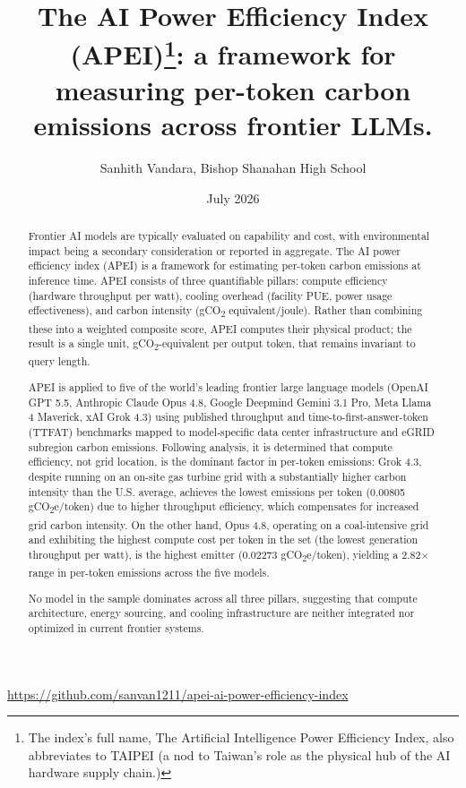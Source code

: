\documentclass[11pt]{article}
\title{The AI Power Efficiency Index (APEI)\thanks{The index's full name, The Artificial Intelligence Power Efficiency Index, also abbreviates to TAIPEI (a nod to Taiwan's role as the physical hub of the AI hardware supply chain.)}: a framework for measuring per-token carbon emissions across frontier LLMs.}
\author{Sanhith Vandara, Bishop Shanahan High School}
\date{July 2026}
\newcommand{\cotwo}{CO\textsubscript{2}}     %
\begin{document}
\maketitle
\vspace{-1.25em}

\begin{center}
\url{https://github.com/sanvan1211/apei-ai-power-efficiency-index}
\end{center}

\begin{abstract}
Frontier AI models are typically evaluated on capability and cost, with environmental impact being a secondary consideration or reported in aggregate. The AI power efficiency index (APEI) is a framework for estimating per-token carbon emissions at inference time. APEI consists of three quantifiable pillars: compute efficiency (hardware throughput per watt), cooling overhead (facility PUE, power usage effectiveness), and carbon intensity (g\cotwo{} equivalent/joule). Rather than combining these into a weighted composite score, APEI computes their physical product; the result is a single unit, g\cotwo-equivalent per output token, that remains invariant to query length.

APEI is applied to five of the world's leading frontier large language models (OpenAI GPT 5.5, Anthropic Claude Opus 4.8, Google Deepmind Gemini 3.1 Pro, Meta Llama 4 Maverick, xAI Grok 4.3) using published throughput and time-to-first-answer-token (TTFAT) benchmarks mapped to model-specific data center infrastructure and eGRID subregion carbon emissions. Following analysis, it is determined that compute efficiency, not grid location, is the dominant factor in per-token emissions: Grok 4.3, despite running on an on-site gas turbine grid with a substantially higher carbon intensity than the U.S. average, achieves the lowest emissions per token (0.00805 g\cotwo e/token) due to higher throughput efficiency, which compensates for increased grid carbon intensity. On the other hand, Opus 4.8, operating on a coal-intensive grid and exhibiting the highest compute cost per token in the set (the lowest generation throughput per watt), is the highest emitter (0.02273 g\cotwo e/token), yielding a 2.82$\times$ range in per-token emissions across the five models.

No model in the sample dominates across all three pillars, suggesting that compute architecture, energy sourcing, and cooling infrastructure are neither integrated nor optimized in current frontier systems.
\end{abstract}
\end{document}
